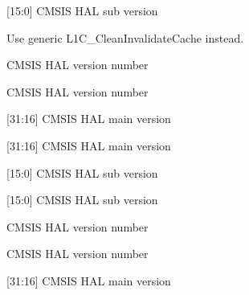 \begin{DoxyRefList}
\label{deprecated__deprecated000081}%
%
\mbox{[}15\+:0\mbox{]} CMSIS HAL sub version  
\item[Global \mbox{\hyperlink{core__ca_8h_a88628cab0d9113dc46a509d6a4d96c58}{\+\_\+\+\_\+\+L1\+C\+\_\+\+Clean\+Invalidate\+Cache}} (uint32\+\_\+t op)]\label{deprecated__deprecated000038}%
%
Use generic L1\+C\+\_\+\+Clean\+Invalidate\+Cache instead.  
\item[Global \mbox{\hyperlink{_core_2_include_2core__sc000_8h_a794ed22b926ab39924705178f2441270}{\+\_\+\+\_\+\+SC000\+\_\+\+CMSIS\+\_\+\+VERSION}} ]\label{deprecated__deprecated000033}%
%
CMSIS HAL version number 

\label{deprecated__deprecated000085}%
%
CMSIS HAL version number  
\item[Global \mbox{\hyperlink{_core_2_include_2core__sc000_8h_a9cca46bbd181abedd1cd6e84ef0b3cf4}{\+\_\+\+\_\+\+SC000\+\_\+\+CMSIS\+\_\+\+VERSION\+\_\+\+MAIN}} ]\label{deprecated__deprecated000031}%
%
\mbox{[}31\+:16\mbox{]} CMSIS HAL main version 

\label{deprecated__deprecated000083}%
%
\mbox{[}31\+:16\mbox{]} CMSIS HAL main version  
\item[Global \mbox{\hyperlink{_core_2_include_2core__sc000_8h_af4db9bbe5ff5726d8a8c388e52d5685d}{\+\_\+\+\_\+\+SC000\+\_\+\+CMSIS\+\_\+\+VERSION\+\_\+\+SUB}} ]\label{deprecated__deprecated000032}%
%
\mbox{[}15\+:0\mbox{]} CMSIS HAL sub version 

\label{deprecated__deprecated000084}%
%
\mbox{[}15\+:0\mbox{]} CMSIS HAL sub version  
\item[Global \mbox{\hyperlink{_include_2core__sc300_8h_a2f960c3c99ab33e1cf4b5287821c44dd}{\+\_\+\+\_\+\+SC300\+\_\+\+CMSIS\+\_\+\+VERSION}} ]\label{deprecated__deprecated000088}%
%
CMSIS HAL version number 

\label{deprecated__deprecated000036}%
%
CMSIS HAL version number  
\item[Global \mbox{\hyperlink{_core_2_include_2core__sc300_8h_a0e2124db4f74f2b355904314accf1790}{\+\_\+\+\_\+\+SC300\+\_\+\+CMSIS\+\_\+\+VERSION\+\_\+\+MAIN}} ]\label{deprecated__deprecated000034}%
%
\mbox{[}31\+:16\mbox{]} CMSIS HAL main version 


\end{DoxyRefList}
